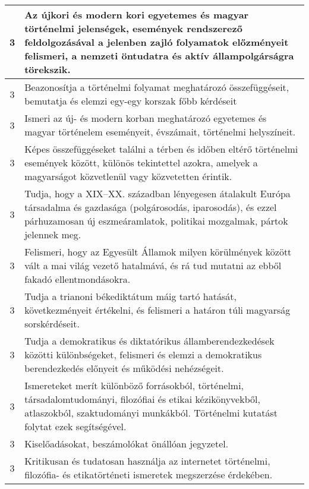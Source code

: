 \begin{longtable}{c | p{} }
                                
                                          3 &  Az újkori és modern kori egyetemes és magyar történelmi jelenségek, események rendszerező feldolgozásával a jelenben zajló folyamatok előzményeit felismeri, a nemzeti öntudatra és aktív állampolgárságra törekszik. \\ \hline
                                          3 &  Beazonosítja a történelmi folyamat meghatározó összefüggéseit, bemutatja és elemzi egy-egy korszak főbb kérdéseit \\ \hline
                                          3 &  Ismeri az új- és modern korban meghatározó egyetemes és magyar történelem eseményeit, évszámait, történelmi helyszíneit. \\ \hline
                                          3 &  Képes összefüggéseket találni a térben és időben eltérő történelmi események között, különös tekintettel azokra, amelyek a magyarságot közvetlenül vagy közvetetten érintik. \\ \hline
                                          3 &  Tudja, hogy a XIX–XX. században lényegesen átalakult Európa társadalma és gazdasága (polgárosodás, iparosodás), és ezzel párhuzamosan új eszmeáramlatok, politikai mozgalmak, pártok jelennek meg. \\ \hline
                                          3 &  Felismeri, hogy az Egyesült Államok milyen körülmények között vált a mai világ vezető hatalmává, és rá tud mutatni az ebből fakadó ellentmondásokra. \\ \hline
                                          3 &  Tudja a trianoni békediktátum máig tartó hatását, következményeit értékelni, és felismeri a határon túli magyarság sorskérdéseit. \\ \hline
                                          3 &  Tudja a demokratikus és diktatórikus államberendezkedések közötti különbségeket, felismeri és elemzi a demokratikus berendezkedés előnyeit és működési nehézségeit. \\ \hline
                                          3 &  Ismereteket merít különböző forrásokból, történelmi, társadalomtudományi, filozófiai és etikai kézikönyvekből, atlaszokból, szaktudományi munkákból. Történelmi kutatást folytat ezek segítségével. \\ \hline
                                          3 &  Kiselőadásokat, beszámolókat önállóan jegyzetel. \\ \hline
                                          3 &  Kritikusan és tudatosan használja az internetet történelmi, filozófia- és etikatörténeti ismeretek megszerzése érdekében. \\ \hline

\end{longtable}

